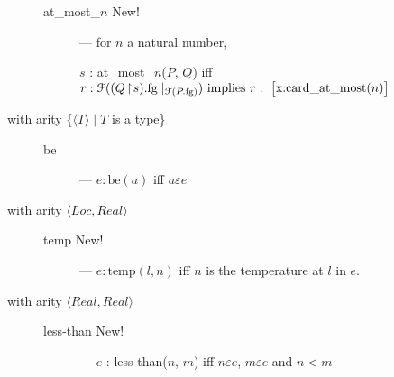 \begin{description}
\begin{description}
      
    \item[\textnormal{at\_most\_$n$} New!] --- for $n$ a natural
      number,

      $s$ : at\_most\_$n$($P$, $Q$) iff
          $r:\mathcal{F}((Q\!\restriction\!        s).\text{fg}\mid_{\mathcal{F}(P.\text{fg})})
        \text{ implies } r:\text{ \smallrecord{\smalltfield{x}{card\_at\_most($n$)}}}$


  \end{description}
\item[with arity \textnormal{\{$\langle T\rangle\mid T$ is a type\}}]
  \mbox{}

  \begin{description}
    
  \item[\textnormal{be}] --- $e:\text{be}(a)$ iff $a\varepsilon e$

  \end{description}

  
\item[with arity
  \textnormal{$\langle\textit{Loc},\textit{Real}\rangle$}] \mbox{}
  \begin{description}
    
  \item[\textnormal{temp} New!] --- $e:\text{temp}(l,n)$ iff $n$ is
    the temperature at $l$ in $e$.

    
  

  \end{description}
  
\item[with arity
  \textnormal{$\langle\textit{Real},\textit{Real}\rangle$}] \mbox{}

  \begin{description}
    
  \item[\textnormal{less-than} New!] --- $e$ : less-than($n$, $m$) iff $n\varepsilon e$, $m\varepsilon e$ and $n<m$

  \end{description}


  


\end{description}

